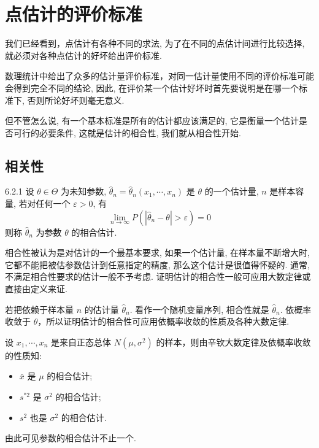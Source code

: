 \section{点估计的评价标准}\label{sec:6.2}

我们已经看到，点估计有各种不同的求法, 为了在不同的点估计间进行比较选择, 就必须对各种点估计的好坏给出评价标准.

数理统计中给出了众多的估计量评价标准，对同一估计量使用不同的评价标准可能会得到完全不同的结论, 因此, 在评价某一个估计好坏时首先要说明是在哪一个标准下, 否则所论好坏则毫无意义.

但不管怎么说, 有一个基本标准是所有的估计都应该满足的, 它是衡量一个估计是否可行的必要条件, 这就是估计的相合性, 我们就从相合性开始.

\subsection{相关性}\label{ssec:6.2.1} %

\begin{definition}{}{6.2.1}
设 $\theta\in\Theta$ 为未知参数, $\hat{\theta}_n=\hat{\theta}_n(x_1,\cdots,x_n)$ 是 $\theta$ 的一个估计量, $n$ 是样本容量, 若对任何一个 $\varepsilon>0$, 有
\begin{equation}\label{eq:6.2.1}
\lim _{n \rightarrow \infty} P(|\hat{\theta}_{n}-\theta|>\varepsilon)=0
\end{equation}
则称 $\hat{\theta}_n$ 为参数 $\theta$ 的相合估计.
\end{definition}
相合性被认为是对估计的一个最基本要求, 如果一个估计量, 在样本量不断增大时, 它都不能把被估参数估计到任意指定的精度, 那么这个估计是很值得怀疑的. 通常, 不满足相合性要求的估计一般不予考虑. 证明估计的相合性一般可应用大数定律或直接由定义来证.

若把依赖于样本量 $n$ 的估计量 $\hat{\theta}_n$. 看作一个随机变量序列, 相合性就是 $\hat{\theta}_n$. 依概率收敛于 $\theta$，所以证明估计的相合性可应用依概率收敛的性质及各种大数定律. 

\begin{example}\label{exam:6.2.1}
设 $x_1,\cdots,x_n$ 是来自正态总体 $N(\mu,\sigma^2)$ 的样本，则由辛钦大数定律及依概率收敛的性质知:
\begin{itemize}
\item $\bar x$ 是 $\mu$ 的相合估计;
\item $s^{*2}$ 是 $\sigma^2$ 的相合估计;
\item $s^2$ 也是 $\sigma^2$ 的相合估计.
\end{itemize}
由此可见参数的相合估计不止一个.
\end{example}

